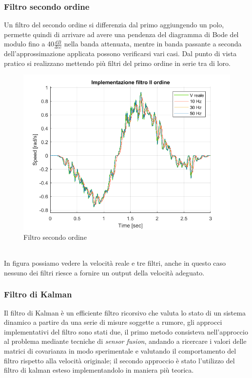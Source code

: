 \subsubsection*{Filtro secondo ordine}
Un filtro del secondo ordine si differenzia dal primo aggiungendo un polo, permette quindi di arrivare ad avere una pendenza del diagramma di Bode del modulo fino a 40$\frac{dB}{dec}$ nella banda attenuata, mentre in banda passante a seconda dell'approssimazione applicata possono verificarsi vari casi. Dal punto di vista pratico si realizzano mettendo più filtri del primo ordine in serie tra di loro. 
\begin{figure}[ht]
	\begin{center}
		\includegraphics[scale=0.5]{Immagini/Traiettorie/FiltroIIOrdine}
		\caption{Filtro secondo ordine}
		\label{fig:filtroIIOrd}
	\end{center}
\end{figure}
\\In figura possiamo vedere la velocità reale e tre filtri, anche in questo caso nessuno dei filtri riesce a fornire un output della velocità adeguato. 
\subsubsection*{Filtro di Kalman}
Il filtro di Kalman è un efficiente filtro ricorsivo che valuta lo stato di un sistema dinamico a partire da una serie di misure soggette a rumore, gli approcci implementativi del filtro sono stati due, il primo metodo consisteva nell'approccio al problema mediante tecniche di \textit{sensor fusion}, andando a ricercare i valori delle matrici di covarianza in modo sperimentale e valutando il comportamento del filtro rispetto alla velocità originale; il secondo approccio è stato l'utilizzo del filtro di kalman esteso implementandolo in maniera più teorica.
